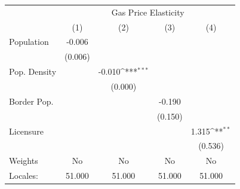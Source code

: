 {
\def\sym#1{\ifmmode^{#1}\else\(^{#1}\)\fi}
\begin{tabular}{l*{4}{c}}
\hline\hline
            &\multicolumn{4}{c}{Gas Price Elasticity}                                               \\
            &\multicolumn{1}{c}{(1)}         &\multicolumn{1}{c}{(2)}         &\multicolumn{1}{c}{(3)}         &\multicolumn{1}{c}{(4)}         \\
\hline
Population  &      -0.006         &                     &                     &                     \\
            &     (0.006)         &                     &                     &                     \\
[1em]
Pop. Density&                     &      -0.010\sym{***}&                     &                     \\
            &                     &     (0.000)         &                     &                     \\
[1em]
Border Pop. &                     &                     &      -0.190         &                     \\
            &                     &                     &     (0.150)         &                     \\
[1em]
Licensure   &                     &                     &                     &       1.315\sym{**} \\
            &                     &                     &                     &     (0.536)         \\
\hline
Weights     &          No         &          No         &          No         &          No         \\
Locales:    &      51.000         &      51.000         &      51.000         &      51.000         \\
\hline\hline
\end{tabular}
}
